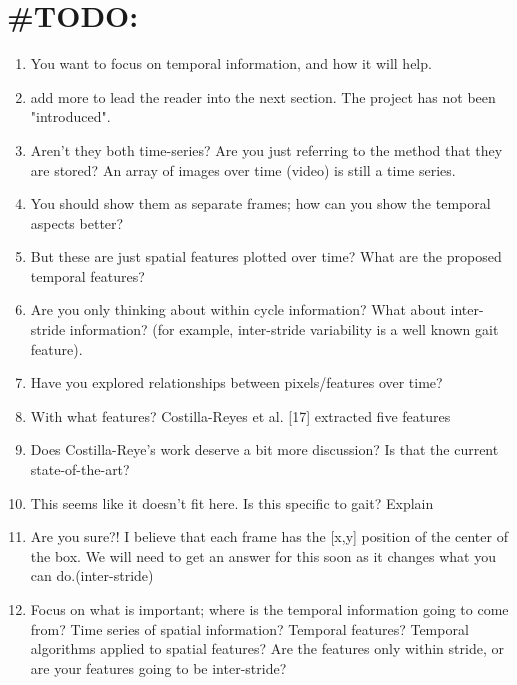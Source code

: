 \documentclass[final,twocolumn]{elsarticle}
\begin{document}
    

    

    

    
    
    
\section*{\#TODO:}
\begin{enumerate}[(1)]

\item You want to focus on temporal information, and how it will help.\\
\item add more to lead the reader into the next section. The project has not been "introduced".\\
\item Aren't they both time-series?  Are you just referring to the method that they are stored?   An array of images over time (video) is still a time series.\\ 
\item You should show them as separate frames; how can you show the temporal aspects better?\\
\item But these are just spatial features plotted over time? What are the proposed temporal features? \\
\item Are you only thinking about within cycle information?  What about inter-stride information?  (for example, inter-stride variability is a well known gait feature).\\
\item Have you explored relationships between pixels/features over time?
\item With what features? Costilla-Reyes et al. [17] extracted five features
\item Does Costilla-Reye's work deserve a bit more discussion?  Is that the current state-of-the-art?
\item This seems like it doesn't fit here.  Is this specific to gait?  Explain  
\item Are you sure?!  I believe that each frame has the [x,y] position of the center of the box.  We will need to get an answer for this soon as it changes what you can do.(inter-stride)
\item Focus on what is important; where is the temporal information going to come from?  Time series of spatial information?  Temporal features?  Temporal algorithms applied to spatial features?  Are the features only within stride, or are your features going to be inter-stride?

\end{enumerate}
\end{document}
